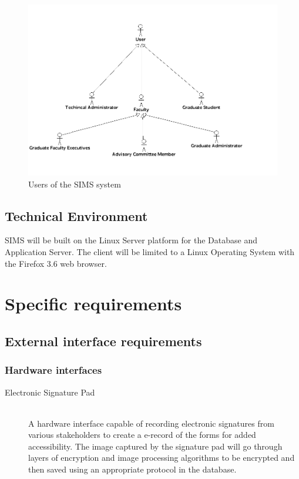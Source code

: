 \documentclass{journal}
\begin{document}
\begin{figure}[!h]
\begin{center}
\includegraphics[width=468px]{diagrams/use_cases/UserHeirachy_uc} \caption{ Users of the SIMS system } \label{fig:Users}

\end{center}
\end{figure}



\subsection{Technical Environment}

SIMS will be built on the Linux Server platform for the Database and Application Server. The client will be limited to a Linux Operating System with the Firefox 3.6 web browser.  

\section{Specific requirements}
\subsection{External interface requirements}
\subsubsection{Hardware interfaces}

\begin{description}
\item[Electronic Signature Pad]\hfill \\
		A hardware interface capable of recording electronic signatures from various stakeholders to create a e-record of the forms for added accessibility. The image captured by the signature pad will go through layers of encryption and image processing algorithms to be encrypted and then saved using an appropriate protocol in the database. 
		\end{description}
\end{document}
